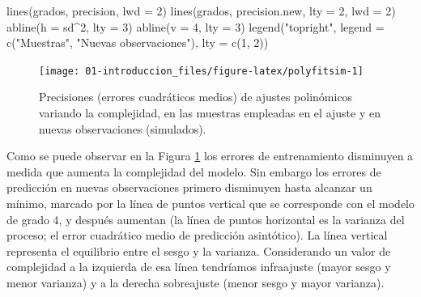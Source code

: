 \documentclass[
]{book}
\newenvironment{Shaded}{\begin{snugshade}}{\end{snugshade}}
\newcommand{\AttributeTok}[1]{\textcolor[rgb]{0.77,0.63,0.00}{#1}}
\newcommand{\DecValTok}[1]{\textcolor[rgb]{0.00,0.00,0.81}{#1}}
\newcommand{\FunctionTok}[1]{\textcolor[rgb]{0.00,0.00,0.00}{#1}}
\newcommand{\NormalTok}[1]{#1}
\newcommand{\SpecialCharTok}[1]{\textcolor[rgb]{0.00,0.00,0.00}{#1}}
\newcommand{\StringTok}[1]{\textcolor[rgb]{0.31,0.60,0.02}{#1}}
\theoremstyle{break}
\theoremstyle{definition}
\theoremstyle{definition}
\theoremstyle{definition}
\theoremstyle{definition}
\theoremstyle{remark}
\begin{document}
\begin{Shaded}
\begin{Highlighting}[]
\FunctionTok{lines}\NormalTok{(grados, precision, }\AttributeTok{lwd =} \DecValTok{2}\NormalTok{)}
\FunctionTok{lines}\NormalTok{(grados, precision.new, }\AttributeTok{lty =} \DecValTok{2}\NormalTok{, }\AttributeTok{lwd =} \DecValTok{2}\NormalTok{)}
\FunctionTok{abline}\NormalTok{(}\AttributeTok{h =}\NormalTok{ sd}\SpecialCharTok{\^{}}\DecValTok{2}\NormalTok{, }\AttributeTok{lty =} \DecValTok{3}\NormalTok{)}
\FunctionTok{abline}\NormalTok{(}\AttributeTok{v =} \DecValTok{4}\NormalTok{, }\AttributeTok{lty =} \DecValTok{3}\NormalTok{)}
\FunctionTok{legend}\NormalTok{(}\StringTok{"topright"}\NormalTok{, }\AttributeTok{legend =} \FunctionTok{c}\NormalTok{(}\StringTok{"Muestras"}\NormalTok{, }\StringTok{"Nuevas observaciones"}\NormalTok{), }\AttributeTok{lty =} \FunctionTok{c}\NormalTok{(}\DecValTok{1}\NormalTok{, }\DecValTok{2}\NormalTok{))}
\end{Highlighting}
\end{Shaded}

\begin{figure}[!htb]

{\centering \texttt{[image: 01-introduccion\_files/figure-latex/polyfitsim-1]} 

}

\caption{Precisiones (errores cuadráticos medios) de ajustes polinómicos variando la complejidad, en las muestras empleadas en el ajuste y en nuevas observaciones (simulados).}\label{fig:polyfitsim}
\end{figure}

Como se puede observar en la Figura \ref{fig:polyfitsim} los errores de entrenamiento disminuyen a medida que aumenta la complejidad del modelo.
Sin embargo los errores de predicción en nuevas observaciones primero disminuyen hasta alcanzar un mínimo, marcado por la línea de puntos vertical que se corresponde con el modelo de grado 4, y después aumentan (la línea de puntos horizontal es la varianza del proceso; el error cuadrático medio de predicción asintótico).
La línea vertical representa el equilibrio entre el sesgo y la varianza.
Considerando un valor de complejidad a la izquierda de esa línea tendríamos infraajuste (mayor sesgo y menor varianza) y a la derecha sobreajuste (menor sesgo y mayor varianza).
\end{document}
